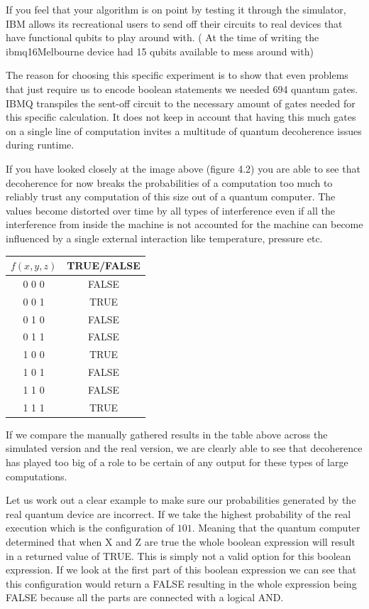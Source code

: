 If you feel that your algorithm is on point by testing it through the simulator, IBM allows its recreational users to send off their circuits to real devices that have functional qubits to play around with. ( At the time of writing the ibmq16Melbourne device had 15 qubits available to mess around with)

The reason for choosing this specific experiment is to show that even problems that just require us to encode boolean statements we needed 694 quantum gates. IBMQ transpiles the sent-off circuit to the necessary amount of gates needed for this specific calculation. It does not keep in account that having this much gates on a single line of computation invites a multitude of quantum decoherence issues during runtime.

If you have looked closely at the image above (figure 4.2) you are able to see that decoherence for now breaks the probabilities of a computation too much to reliably trust any computation of this size out of a quantum computer. The values become distorted over time by all types of interference even if all the interference from inside the machine is not accounted for the machine can become influenced by a single external interaction like temperature, pressure etc. 

\begin{center}
	\begin{tabular}{|| c c ||}
		\hline
		$f(x,y,z)$ & TRUE/FALSE \\
		\hline\hline
		0 0 0 & FALSE \\ 
		0 0 1 & TRUE \\
		0 1 0 & FALSE \\
		0 1 1 & FALSE \\
		1 0 0 & TRUE \\
		1 0 1 & FALSE \\
		1 1 0 & FALSE \\
		1 1 1 & TRUE \\
		\hline
	\end{tabular}
\end{center}

If we compare the manually gathered results in the table above across the simulated version and the real version, we are clearly able to see that decoherence has played too big of a role to be certain of any output for these types of large computations.

Let us work out a clear example to make sure our probabilities generated by the real quantum device are incorrect. If we take the highest probability of the real execution which is the configuration of $101$. Meaning that the quantum computer determined that when X and Z are true the whole boolean expression will result in a returned value of TRUE. This is simply not a valid option for this boolean expression. If we look at the first part of this boolean expression we can see that this configuration would return a FALSE resulting in the whole expression being FALSE because all the parts are connected with a logical AND. 

